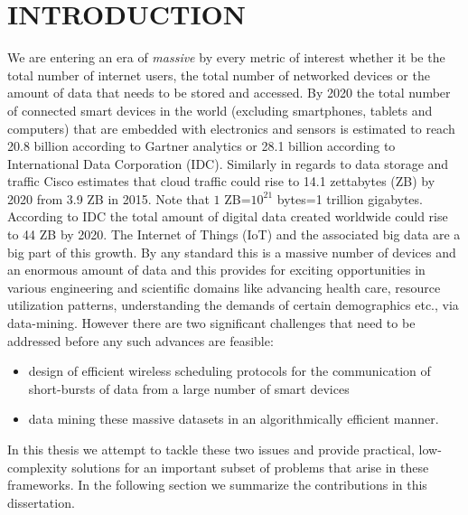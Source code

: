 %
%
%
%



\pagestyle{plain} %
\setcounter{page}{1}

\chapter{INTRODUCTION}
\indent We are entering an era of \emph{massive} by every metric of interest whether it be the total number of internet users, the total number of networked devices or the amount of data that needs to be stored and accessed. By 2020 the total number of connected smart devices in the world (excluding smartphones, tablets and computers) that are embedded with electronics and sensors is estimated to reach 20.8 billion according to Gartner analytics or 28.1 billion according to International Data Corporation (IDC). Similarly in regards to data storage and traffic Cisco estimates that cloud traffic could rise to 14.1 zettabytes (ZB) by 2020 from 3.9 ZB in 2015. Note that $1$ ZB=$10^{21}$ bytes=1 trillion gigabytes. According to IDC the total amount of digital data created worldwide could rise to 44 ZB by 2020. The Internet of Things (IoT) and the associated big data are a big part of this growth. By any standard this is a massive number of devices and an enormous amount of data and this provides for exciting opportunities in various engineering and scientific domains like advancing health care, resource utilization patterns, understanding the demands of certain demographics etc., via data-mining. However there are two significant challenges that need to be addressed before any such advances are feasible:
\begin{itemize}
\item design of efficient wireless scheduling protocols for the communication of short-bursts of data from a large number of smart devices 
\item data mining these massive datasets in an algorithmically efficient manner.
\end{itemize}
In this thesis we attempt to tackle these two issues and provide practical, low-complexity solutions for an important  subset of problems that arise in these frameworks. In the following section we summarize the contributions in this dissertation.
